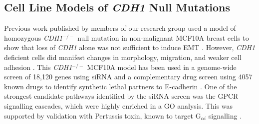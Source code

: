 \subsection{Cell Line Models of \textit{CDH1} Null Mutations}
Previous work published by members of our research group used a model of  homozygous \textit{CDH1}$^{-/-}$ null \gls{mutation} in non-malignant MCF10A breast cells to show that loss of \textit{CDH1} alone was not sufficient to induce \gls{EMT} %
\citep{Chen2014}. However, \textit{CDH1} deficient cells did manifest changes in morphology, migration, and weaker cell adhesion \citep{Chen2014}.
%
This \textit{CDH1}$^{-/-}$  MCF10A model has been used in a \gls{genome}-wide screen of 18,120 genes using \gls{siRNA} and a complementary drug screen using 4057 known drugs to identify \gls{synthetic lethal} partners to \gls{E-cadherin} \citep{Telford2015}. One of the strongest candidate pathways identified by the \gls{siRNA} screen was the \gls{GPCR} signalling cascades, which were highly enriched in a \acrfull{GO} analysis. %
This was supported by validation with Pertussis toxin, known to target  G$_{\alpha i}$ signalling \citep{Clark2004}. %


